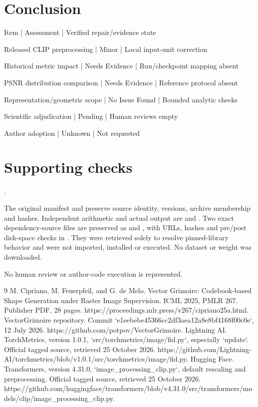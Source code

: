 \documentclass[10pt]{article}
\begin{document}
\section*{Conclusion}
Item | Assessment | Verified repair/evidence state\par
Released CLIP preprocessing | Minor | Local input-unit correction\par
Historical metric impact | Needs Evidence | Run/checkpoint mapping absent\par
PSNR distribution comparison | Needs Evidence | Reference protocol absent\par
Representation/geometric scope | No Issue Found | Bounded analytic checks\par
Scientific adjudication | Pending | Human reviews empty\par
Author adoption | Unknown | Not requested\par
\section*{Supporting checks}
.\par
The original manifest and preserve source identity, versions, archive membership and hashes. Independent arithmetic and actual output are and . Two exact dependency-source files are preserved as and , with URLs, hashes and pre/post disk-space checks in . They were retrieved solely to resolve pinned-library behavior and were not imported, installed or executed. No dataset or weight was downloaded.\par
No human review or author-code execution is represented.\par
9 M. Cipriano, M. Feuerpfeil, and G. de Melo. Vector Grimoire: Codebook-based Shape Generation under Raster Image Supervision. ICML 2025, PMLR 267. Publisher PDF, 28 pages. https://proceedings.mlr.press/v267/cipriano25a.html. VectorGrimoire repository. Commit `e1eebebe45366cc2df3aea12a8e8bf4168f00c0e`, 12 July 2026. https://github.com/potpov/VectorGrimoire. Lightning AI. TorchMetrics, version 1.0.1, `src/torchmetrics/image/fid.py`, especially `update`. Official tagged source, retrieved 25 October 2026. https://github.com/Lightning-AI/torchmetrics/blob/v1.0.1/src/torchmetrics/image/fid.py. Hugging Face. Transformers, version 4.31.0, `image\_processing\_clip.py`, default rescaling and preprocessing. Official tagged source, retrieved 25 October 2026. https://github.com/huggingface/transformers/blob/v4.31.0/src/transformers/models/clip/image\_processing\_clip.py.\par
\end{document}
